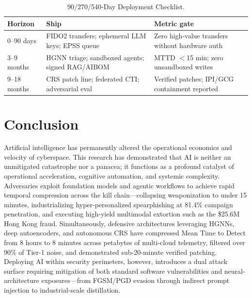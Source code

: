 \documentclass[conference,10pt,twocolumn,a4paper]{IEEEtran}
\begin{document}
\begin{table}[t]
\caption{90/270/540-Day Deployment Checklist.}
\label{tab:playbook}
\centering
\footnotesize
\begin{tabular}{lll}
\toprule
\textbf{Horizon} & \textbf{Ship} & \textbf{Metric gate} \\
\midrule
0--90 days & FIDO2 transfers; ephemeral LLM keys; EPSS queue & Zero high-value transfers without hardware auth \\
3--9 months & HGNN triage; sandboxed agents; signed RAG/AIBOM & MTTD $<$15 min; zero unsandboxed writes \\
9--18 months & CRS patch line; federated CTI; adversarial eval & Verified patches; IPI/GCG containment reported \\
\bottomrule
\end{tabular}
\end{table}

\section{Conclusion}
Artificial intelligence has permanently altered the operational economics and velocity of cyberspace. This research has demonstrated that AI is neither an unmitigated catastrophe nor a panacea; it functions as a profound catalyst of operational acceleration, cognitive automation, and systemic complexity. Adversaries exploit foundation models and agentic workflows to achieve rapid temporal compression across the kill chain---collapsing weaponization to under 15 minutes, industrializing hyper-personalized spearphishing at 81.4\% campaign penetration, and executing high-yield multimodal extortion such as the \$25.6M Hong Kong fraud. Simultaneously, defensive architectures leveraging HGNNs, deep autoencoders, and autonomous CRS have compressed Mean Time to Detect from 8 hours to 8 minutes across petabytes of multi-cloud telemetry, filtered over 90\% of Tier-1 noise, and demonstrated sub-20-minute verified patching. Deploying AI within security perimeters, however, introduces a dual attack surface requiring mitigation of both standard software vulnerabilities and neural-architecture exposures---from FGSM/PGD evasion through indirect prompt injection to industrial-scale distillation.
\end{document}
